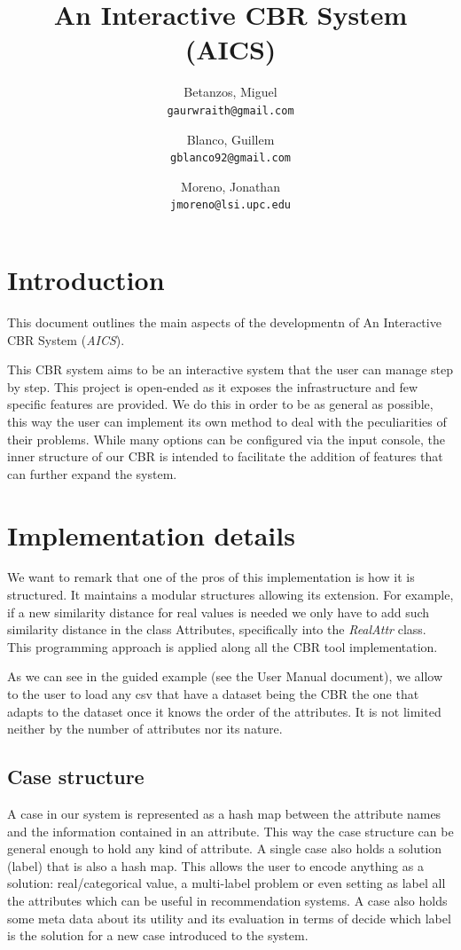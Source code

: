 \documentclass[11pt]{article}
\title{An Interactive CBR System (AICS)}
\author{
  Betanzos, Miguel\\
  \texttt{gaurwraith@gmail.com}
  \and
  Blanco, Guillem\\
  \texttt{gblanco92@gmail.com}
  \and
  Moreno, Jonathan\\
  \texttt{jmoreno@lsi.upc.edu}
}
\date{}
\begin{document}
\maketitle


\section{Introduction}

This document outlines the main aspects of the developmentn of An Interactive CBR System (\emph{AICS}).

This CBR system aims to be an interactive system that the user can manage step by step. This project is open-ended as it exposes the infrastructure and few specific features are provided. We do this in order to be as general as possible, this way the user can implement its own method to deal with the peculiarities of their problems. While many options can be configured via the input console, the inner structure of our CBR is intended to facilitate the addition of features that can further expand the system.

\section{Implementation details}

We want to remark that one of the pros of this implementation is how it is structured. It maintains a modular structures allowing its extension. For example, if a new similarity distance for real values is needed we only have to add such similarity distance in the class Attributes, specifically into the \emph{RealAttr} class. This programming approach is applied along all the CBR tool implementation.

As we can see in the guided example (see the User Manual document), we allow to the user to load any csv that have a dataset being the CBR the one that adapts to the dataset once it knows the order of the attributes. It is not limited neither by the number of attributes nor its nature.

\subsection{Case structure}

A case in our system is represented as a hash map between the attribute names and the information contained in an attribute. This way the case structure can be general enough to hold any kind of attribute. A single case also holds a solution (label) that is also a hash map. This allows the user to encode anything as a solution: real/categorical value, a multi-label problem or even setting as label all the attributes which can be useful in recommendation systems. A case also holds some meta data about its utility and its evaluation in terms of decide which label is the solution for a new case introduced to the system.
\end{document}
